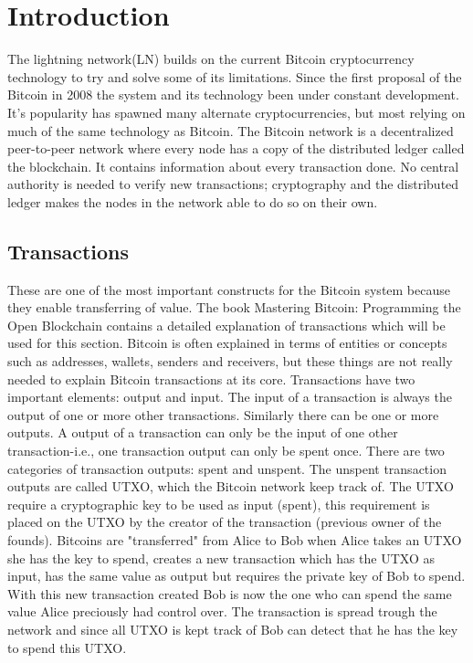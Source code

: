 \documentclass[informationsecurity]{gucmasterproject}
\begin{document}
\tableofcontents



\chapter{Introduction}

The lightning network(LN) builds on the current Bitcoin cryptocurrency technology to try and solve some of its limitations.
Since the first proposal of the Bitcoin in 2008\cite{nakamoto2008bitcoin} the system and its technology been under constant development. It's popularity has spawned many alternate cryptocurrencies, but most relying on much of the same technology as Bitcoin. The Bitcoin network is a decentralized peer-to-peer network where every node has a copy of the distributed ledger called the blockchain. It contains information about every transaction done. No central authority is needed to verify new transactions; cryptography and the distributed ledger makes the nodes in the network able to do so on their own.

\section{Transactions}
These are one of the most important constructs for the Bitcoin system because they enable transferring of value. The book Mastering Bitcoin: Programming the Open Blockchain \cite{antonopoulos2017mastering} contains a detailed explanation of transactions which will be used for this section. Bitcoin is often explained in terms of entities or concepts such as addresses, wallets, senders and receivers, but these things are not really needed to explain Bitcoin transactions at its core. Transactions have two important elements: output and input. The input of a transaction is always the output of one or more other transactions. Similarly there can be one or more outputs. A output of a transaction can only be the input of one other transaction-i.e., one transaction output can only be spent once. There are two categories of transaction outputs: spent and unspent. The unspent transaction outputs are called UTXO, which the Bitcoin network keep track of. The UTXO require a cryptographic key to be used as input (spent), this requirement is placed on the UTXO by the creator of the transaction (previous owner of the founds). Bitcoins are "transferred" from Alice to Bob when Alice takes an UTXO she has the key to spend, creates a new transaction which has the UTXO as input, has the same value as output but requires the private key of Bob to spend. 
With this new transaction created Bob is now the one who can spend the same value Alice preciously had control over.
The transaction is spread trough the network and since all UTXO is kept track of Bob can detect that he has the key to spend this UTXO.
\end{document}
